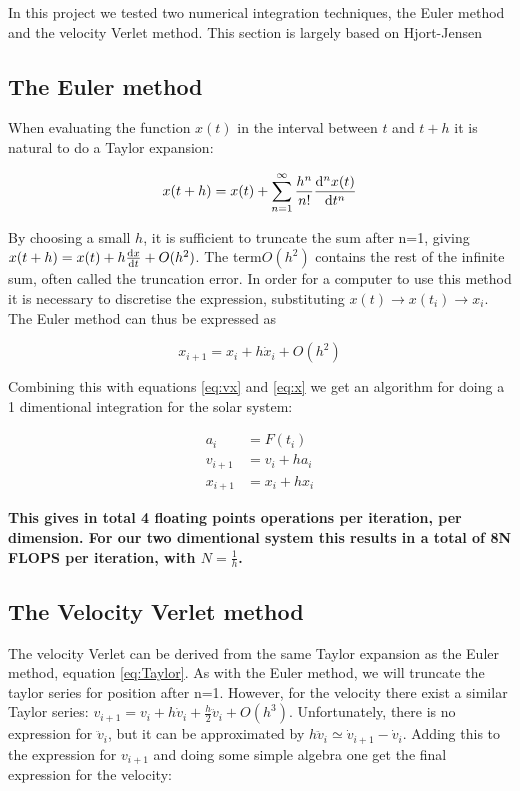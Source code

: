 
In this project we tested two numerical integration techniques, the Euler method and the velocity Verlet method.  This section is largely based on Hjort-Jensen \cite{Jensen}	



\subsection{The Euler  method}


When evaluating the function $ x(t)$ in the interval between $ t $ and $ t+h $ it is natural to do a Taylor expansion:  

\begin{equation}
x(t+h) = x(t) +\sum\limits_{n=1}^{\infty} 	\frac{ h^n}{n!}\dv[n]{x(t)}{t}   \label{eq:Taylor}
\end{equation}

By choosing a small $ h $, it is sufficient to truncate the sum after n=1, giving  $ x(t+h) = x(t) + h \dv{x}{t} + O(h^2) $. The term$ O(h^2) $ contains the rest of  the infinite sum, often called the truncation error. In order for a computer to use this method it is necessary to discretise  the expression, substituting $ x(t) \rightarrow x( t_i ) \rightarrow x_i$. The Euler method can thus be expressed as 

\begin{equation}
	x_{i+1} = x_i + h\dot{x}_i + O(h^2)
\end{equation}
 
 Combining this with equations  \ref{eq:vx} and \ref{eq:x} we get an algorithm for doing a  1 dimentional integration for the solar system:
 
 \begin{align}
 a_i &= F(t_i)\\
 v_{i+1} &= v_i + ha_i\\
  x_{i+1} &= x_i + hx_i
 \end{align}
 
\textbf{ This gives in total 4 floating points operations per iteration, per dimension. For our two dimentional system this results in a total of 8N FLOPS per iteration, with $ N = \frac{1}{h} $.}
 
 


\subsection{The Velocity Verlet method}

The velocity Verlet can be derived from the same Taylor expansion as the Euler method, equation \ref{eq:Taylor}. As with the Euler method, we will truncate the taylor series for position after n=1. However, for the velocity there exist a similar Taylor series: $  v_{i+1} = v_i + h\dot{v}_i + \frac{h}{2} \ddot{v}_i + O(h^3)$. Unfortunately, there is no expression for $ \ddot{v}_i $, but it can be approximated by $ h\ddot{v}_i \simeq \dot{v}_{i+1}-\dot{v}_i$. Adding this to the expression for $ v_{i+1} $ and doing some simple algebra one get the final expression for the velocity:

